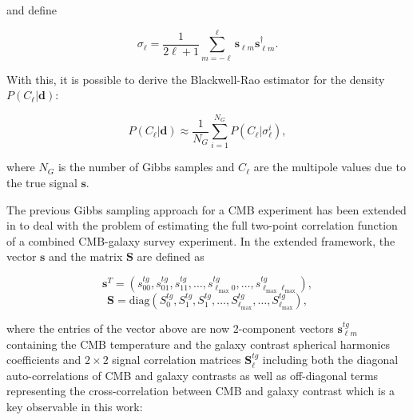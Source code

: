 \documentclass[openany,a4paper,12pt,oneside]{book}
\begin{document}
\begin{spacing}{1.5}
\noindent and define

\begin{equation}\label{sigma_l}
	\sigma_\ell=\frac{1}{2\ell+1}\sum_{m=-\ell}^\ell \mathbf{s}_{\ell m}\mathbf{s}_{\ell m}^{\dagger}.
\end{equation}




With this, it is possible to derive the Blackwell-Rao estimator for the density $P(C_\ell|\mathbf{d})$:

\begin{equation}\label{BR_estimator}
	P(C_\ell|\mathbf{d})\approx \frac{1}{N_G}\sum_{i=1}^{N_G}P(C_\ell|\sigma_\ell^i),
\end{equation}

\noindent where $N_G$ is the number of Gibbs samples and $C_\ell$ are the multipole values due to the true signal $\mathbf{s}$.

The previous Gibbs sampling approach for a CMB experiment has been extended in \cite{Moura-Santos_2016} to deal with the problem of estimating the full two-point correlation function of a combined CMB-galaxy survey experiment. In the extended framework, the vector $\mathbf{s}$ and the matrix $\mathbf{S}$ are defined as


\begin{equation}\label{vec_s}
	\mathbf{s}^T=(s_{00}^{tg}, s_{01}^{tg}, s_{11}^{tg}, \dots, s_{\ell_\text{max}0}^{tg}, \dots, s_{\ell_\text{max} \ell_\text{max}}^{tg}),
\end{equation}
\begin{equation}\label{matrix_S}
	\mathbf{S}=\text{diag}(S_0^{tg}, S_1^{tg}, S_1^{tg},\dots, S_{\ell_\text{max}}^{tg}, \dots, S_{\ell_\text{max}}^{tg}),
\end{equation}

\noindent where the entries of the vector above are now 2-component vectors $\mathbf{s}_{\ell m}^{tg}$ containing the CMB temperature and the galaxy contrast spherical harmonics coefficients and $2\times 2$ signal correlation matrices $\mathbf{S}_\ell^{tg}$ including both the diagonal auto-correlations of CMB and galaxy contrasts as well as off-diagonal terms representing the cross-correlation between CMB and galaxy contrast which is a key observable in this work:


\end{spacing}
\end{document}
